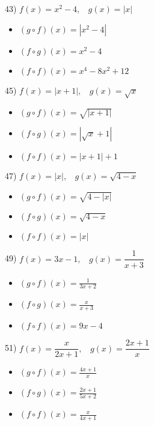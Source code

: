 \documentclass[11pt]{book}
\theoremstyle{definition}  %
\begin{document}
43) $f(x)=x^2-4,~~~~g(x)=|x|$
\scriptsize
\begin{multicols}{3}
\begin{itemize}
\item  $(g\circ f)(x)=|x^2-4|$
\item  $(f\circ g)(x)=x^2-4$
\item  $(f\circ f)(x)=x^4-8x^2+12$
\end{itemize}
\end{multicols}
\normalsize

45) $f(x)=|x+1|,~~~~g(x)=\sqrt{x}$
\scriptsize
\begin{multicols}{3}
\begin{itemize}
\item  $(g\circ f)(x)=\sqrt{|x+1|}$
\item  $(f\circ g)(x)=|\sqrt{x}+1|$
\item  $(f\circ f)(x)=|x+1|+1$
\end{itemize}
\end{multicols}
\normalsize

47) $f(x)=|x|,~~~~g(x)=\sqrt{4-x}$
\scriptsize
\begin{multicols}{3}
\begin{itemize}
\item  $(g\circ f)(x)=\sqrt{4-|x|}$
\item  $(f\circ g)(x)=\sqrt{4-x}$
\item  $(f\circ f)(x)=|x|$
\end{itemize}
\end{multicols}
\normalsize

49) $f(x)=3x-1,~~~~g(x)=\dfrac{1}{x+3}$
\scriptsize
\begin{multicols}{3}
\begin{itemize}
\item  $(g\circ f)(x)=\frac{1}{3x+2}$
\item  $(f\circ g)(x)=\frac{x}{x+3}$
\item  $(f\circ f)(x)=9x-4$
\end{itemize}
\end{multicols}
\normalsize

51) $f(x)=\dfrac{x}{2x+1},~~~~g(x)=\dfrac{2x+1}{x}$
\scriptsize
\begin{multicols}{3}
\begin{itemize}
\item  $(g\circ f)(x)=\frac{4x+1}{x}$
\item  $(f\circ g)(x)=\frac{2x+1}{5x+2}$
\item  $(f\circ f)(x)=\frac{x}{4x+1}$
\end{itemize}
\end{multicols}
\normalsize
\end{document}
